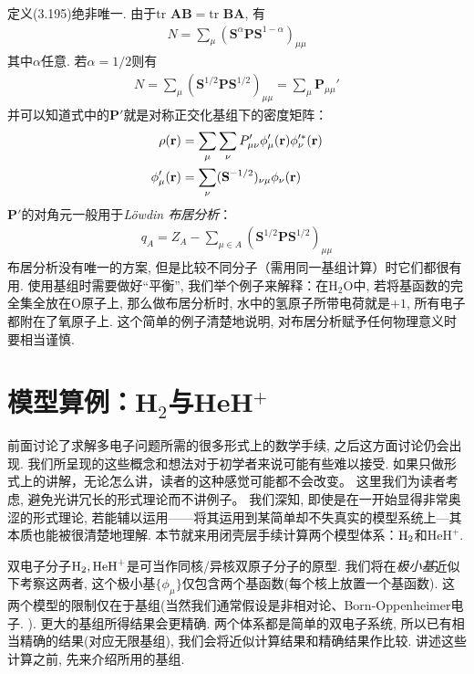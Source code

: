 定义(3.195)绝非唯一. 
由于$\mathrm{tr}\,\,\mathbf{AB}=\mathrm{tr}\,\,\mathbf{BA}$, 
有
\begin{align}
	N = \sum_\mu (\mathbf{S}^\alpha\mathbf{PS}^{1-\alpha})_{\mu\mu}
\end{align}
其中$\alpha$任意. 
若$\alpha=1/2$则有
\begin{align}
	\label{3.198}
	N = \sum_\mu (\mathbf{S}^{1/2}\mathbf{PS}^{1/2})_{\mu\mu} = \sum_\mu \mathbf{P}_{\mu\mu}'
\end{align}
并可以知道式中的$\mathbf{P}'$就是对称正交化基组下的密度矩阵：
\begin{align}
	\rho(\mathbf{r}) &= \sum_\mu\sum_\nu P'_{\mu\nu}\phi_\mu'(\mathbf{r})\phi_\nu^{\prime *}(\mathbf{r})\\
	\phi'_{\mu}(\mathbf{r}) &= \sum_\nu(\mathbf{S}^{-1/2})_{\nu\mu}\phi_\nu(\mathbf{r})
\end{align}
$\mathbf{P}'$的对角元一般用于\emph{L\"owdin 布居分析}：
\begin{align}
	q_A = Z_A - \sum_{\mu\in A}(\mathbf{S}^{1/2}\mathbf{PS}^{1/2})_{\mu\mu}
\end{align}
布居分析没有唯一的方案, 
但是比较不同分子（需用同一基组计算）时它们都很有用. 
使用基组时需要做好``平衡'', 
我们举个例子来解释：在$\mathrm{H}_2\mathrm{O}$中, 
若将基函数的完全集全放在$\mathrm{O}$原子上, 
那么做布居分析时, 
水中的氢原子所带电荷就是$+1$, 
所有电子都附在了氧原子上. 
这个简单的例子清楚地说明,
对布居分析赋予任何物理意义时要相当谨慎.

\section{模型算例：H$_2$与HeH$^+$}
前面讨论了求解多电子问题所需的很多形式上的数学手续, 
之后这方面讨论仍会出现. 
我们所呈现的这些概念和想法对于初学者来说可能有些难以接受. 如果只做形式上的讲解，无论怎么讲，读者的这种感觉可能都不会改变。
这里我们为读者考虑, 避免光讲冗长的形式理论而不讲例子。 
我们深知, 即使是在一开始显得非常奥涩的形式理论, 
若能辅以运用——将其运用到某简单却不失真实的模型系统上---其本质也能被很清楚地理解. 
本节就来用闭壳层\hft 手续计算两个模型体系：$\mathrm{H}_2$和$\mathrm{HeH}^+$.


双电子分子$\mathrm{H}_2,\mathrm{HeH}^+$是可当作同核/异核双原子分子的原型. 
我们将在\emph{极小基}近似下考察这两者, 
这个极小基$\{\phi_\mu\}$仅包含两个基函数(每个核上放置一个基函数). 
这两个模型的限制仅在于基组(当然我们通常假设是非相对论、Born-Oppenheimer电子\ha.
). 
更大的基组所得结果会更精确. 
两个体系都是简单的双电子系统, 
所以已有相当精确的结果(对应无限基组), 
我们会将近似计算结果和精确结果作比较. 
讲述这些计算之前, 
先来介绍所用的基组.

